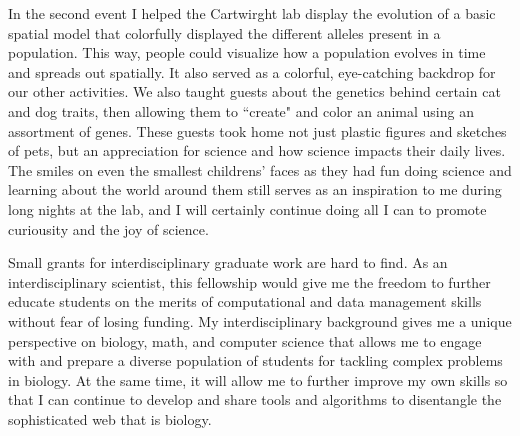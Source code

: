 \documentclass[12pt]{article}
\begin{document}
In the second event I helped the Cartwirght lab display the evolution of a basic spatial model that colorfully displayed the different alleles present in a population. This way, people could visualize how a population evolves in time and spreads out spatially. It also served as a colorful, eye-catching backdrop for our other activities. We also taught guests about the genetics behind certain cat and dog traits, then allowing them to ``create" and color an animal using an assortment of genes. These guests took home not just plastic figures and sketches of pets, but an appreciation for science and how science impacts their daily lives. The smiles on even the smallest childrens' faces as they had fun doing science and learning about the world around them still serves as an inspiration to me during long nights at the lab, and I will certainly continue doing all I can to promote curiousity and the joy of science.

Small grants for interdisciplinary graduate work are hard to find.
As an interdisciplinary scientist, this fellowship would give me the freedom to further educate students on the merits of computational and data management skills without fear of losing funding. My interdisciplinary background gives me a unique perspective on biology, math, and computer science that allows me to engage with and prepare a diverse population of students for tackling complex problems in biology.
At the same time, it will allow me to further improve my own skills so that I can continue to develop and share tools and algorithms to disentangle the sophisticated web that is biology.
\end{document}
